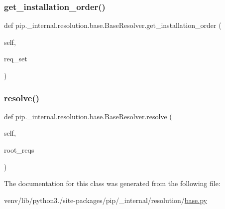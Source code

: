 \subsubsection{\texorpdfstring{get\+\_\+installation\+\_\+order()}{get\_installation\_order()}}
{\footnotesize\ttfamily def pip.\+\_\+internal.\+resolution.\+base.\+Base\+Resolver.\+get\+\_\+installation\+\_\+order (\begin{DoxyParamCaption}\item[{}]{self,  }\item[{}]{req\+\_\+set }\end{DoxyParamCaption})}

\mbox{\label{classpip_1_1__internal_1_1resolution_1_1base_1_1BaseResolver_a7b30f23c7302a4e07977e1ee24b96279}} 
\subsubsection{\texorpdfstring{resolve()}{resolve()}}
{\footnotesize\ttfamily def pip.\+\_\+internal.\+resolution.\+base.\+Base\+Resolver.\+resolve (\begin{DoxyParamCaption}\item[{}]{self,  }\item[{}]{root\+\_\+reqs }\end{DoxyParamCaption})}



The documentation for this class was generated from the following file\+:\begin{DoxyCompactItemize}
\item 
venv/lib/python3./site-\/packages/pip/\+\_\+internal/resolution/\hyperlink{__internal_2resolution_2base_8py}{base.\+py}\end{DoxyCompactItemize}
